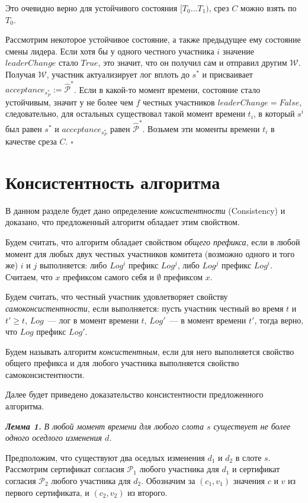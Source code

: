 Это очевидно верно для устойчивого состояния $[T_0...T_1)$, срез $C$ можно взять по $T_0$.

Рассмотрим некоторое устойчивое состояние, а также предыдущее ему состояние смены лидера.
Если хотя бы у одного честного участника $i$ значение $leaderChange$ стало $True$, это значит, что он получил сам и отправил другим $\mathcal{W}$. Получая $\mathcal{W}$, участник актуализирует лог вплоть до $s^{*}$ и присваивает $acceptance_{s_P^{*}} := \hat{\mathcal{P}}^{*}$. Если в какой-то момент времени, состояние стало устойчивым, значит у не более чем $f$ честных участников $leaderChange = False$, следовательно, для остальных существовал такой момент времени $t_i$, в который $s^i$ был равен $s^{*}$ и $acceptance_{s_P^{*}}$ равен $\hat{\mathcal{P}}^{*}$. Возьмем эти моменты времени $t_i$ в качестве среза $C$. $\square$

\section{Консистентность алгоритма}
В данном разделе будет дано определение \textit{консистентности} (Consistency)\cite{hybrid-consensus} и доказано, что предложенный алгоритм обладает этим свойством.

Будем считать, что алгоритм обладает свойством \textit{общего префикса}, если в любой момент для любых двух честных участников комитета (возможно одного и того же) $i$ и $j$ выполняется: либо $Log^i$ префикс $Log^j$, либо $Log^j$ префикс $Log^i$. Считаем, что $x$ префиксом самого себя и $\emptyset$ префиксом $x$.

Будем считать, что честный участник удовлетворяет свойству \textit{самоконсистентности}, если выполняется: пусть участник честный во время $t$ и $t' \ge t$, $Log$~--- лог в момент времени $t$, $Log'$~--- в момент времени $t'$, тогда верно, что $Log$ префикс $Log'$.

Будем называть алгоритм \textit{консистентным}, если для него выполняется свойство общего префикса и для любого участника выполняется свойство самоконсистентности.
 
Далее будет приведено доказательство консистентности предложенного алгоритма.

\textbf{\textit{Лемма 1.}} \textit{В любой момент времени для любого слота $s$ существует не более одного оседлого изменения $d$.}

Предположим, что существуют два оседлых изменения $d_1$ и $d_2$ в слоте $s$. Рассмотрим сертификат согласия $\mathcal{P}_1$ любого участника для $d_1$ и сертификат согласия $\mathcal{P}_2$ любого участника для $d_2$. Обозначим за $(c_1, v_1)$ значения $c$ и $v$ из первого сертификата, и $(c_2, v_2)$ из второго.

